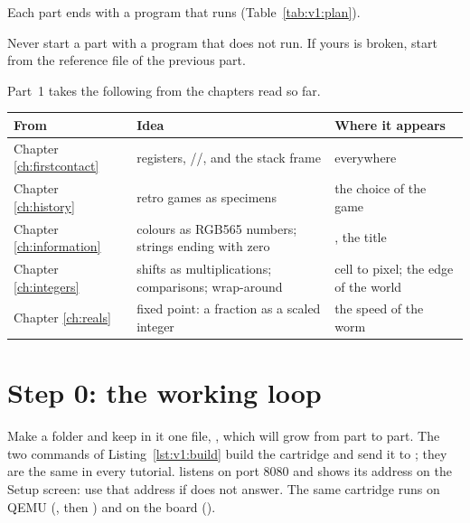 Each part ends with a program that runs (Table~\ref{tab:v1:plan}).

\begin{prgwarn}
Never start a part with a program that does not run. If yours is broken,
start from the reference file of the previous part.
\end{prgwarn}

Part~1 takes the following from the chapters read so far.

\begin{center}\small
\begin{tabularx}{\textwidth}{@{}lLL@{}}
\toprule
\textbf{From} & \textbf{Idea} & \textbf{Where it appears}\\
\midrule
Chapter \ref{ch:firstcontact} & registers, //,  and the stack frame & everywhere\\
Chapter \ref{ch:history} & retro games as specimens & the choice of the game\\
Chapter \ref{ch:information} & colours as RGB565 numbers; strings ending with zero & , the title\\
Chapter \ref{ch:integers} & shifts as multiplications; comparisons; wrap-around & cell to pixel; the edge of the world\\
Chapter \ref{ch:reals} & fixed point: a fraction as a scaled integer & the speed of the worm\\
\bottomrule
\end{tabularx}
\end{center}

\section{Step 0: the working loop}

Make a folder  and keep in it one file,
, which will grow from part to part. The two commands of
Listing~\ref{lst:v1:build} build the cartridge and send it to \prgqt; they
are the same in every tutorial. \prgqt listens on port 8080 and shows its
address on the Setup screen: use that address if  does not
answer. The same cartridge runs on QEMU (, then
) and on the board ().


